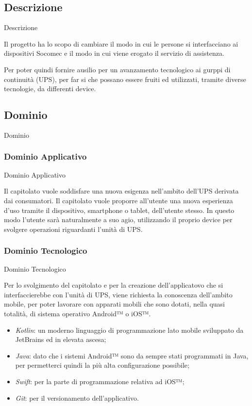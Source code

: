 \documentclass[11pt]{article}
\begin{document}
    \subsection{Descrizione} Descrizione
    
    Il progetto ha lo scopo di cambiare il modo in cui le persone si interfacciano ai dispositivi Socomec e il modo in
    cui viene erogato il servizio di assistenza.
    
    Per poter quindi fornire ausilio per un avanzamento tecnologico ai gurppi di continuità (UPS), per far si che possano essere fruiti ed utilizzati, tramite diverse tecnologie, da differenti device.
    
    
    \subsection{Dominio} Dominio
        \subsubsection{Dominio Applicativo} Dominio Applicativo
        
        Il capitolato vuole soddisfare una nuova esigenza nell'ambito dell'UPS derivata dai consumatori.
        Il capitolato vuole proporre all’utente una nuova esperienza d’uso tramite il dispositivo, smartphone o
        tablet, dell’utente stesso.
        In questo modo l’utente sarà naturalmente a suo agio, utilizzando il proprio device per svolgere operazioni riguardanti l'unità di UPS.
        \subsubsection{Dominio Tecnologico} Dominio Tecnologico
        
        Per lo svolgimento del capitolato e per la creazione dell'applicatovo che si interfaccierebbe con l'unità di UPS, viene richiesta la conoscenza dell'ambito mobile, per poter lavorare con apparati mobili che sono dotati, nella quasi totalità, di sistema operativo Android™ o iOS™.
        \begin{itemize}
            \item \textit{Kotlin}: un moderno linguaggio di programmazione lato mobile sviluppato da JetBrains ed in elevata ascesa;
            \item \textit{Java}: dato che i sistemi Android™ sono da sempre stati programmati in Java, per permetterci quindi la più alta configurazione possibile;
            \item \textit{Swift}: per la parte di programmazione relativa ad iOS™;
            \item \textit{Git}: per il versionamento dell'applicativo.
        \end{itemize}
    
\end{document}
